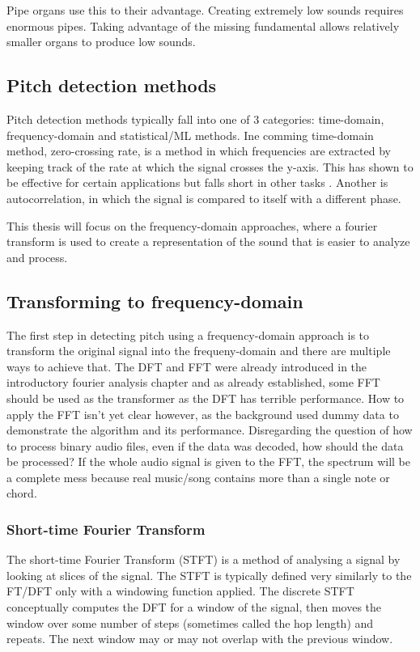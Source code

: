 Pipe organs use this to their advantage. Creating extremely low sounds requires enormous pipes. Taking advantage of the missing fundamental allows relatively smaller organs to produce low sounds.

\subsection{Pitch detection methods}
Pitch detection methods typically fall into one of 3 categories: time-domain, frequency-domain and statistical/ML methods. Ine comming time-domain method, zero-crossing rate, is a method in which frequencies are extracted by keeping track of the rate at which the signal crosses the y-axis. This has shown to be effective for certain applications but falls short in other tasks . Another is autocorrelation, in which the signal is compared to itself with a different phase. 

This thesis will focus on the frequency-domain approaches, where a fourier transform is used to create a representation of the sound that is easier to analyze and process.

\subsection {Transforming to frequency-domain}
The first step in detecting pitch using a frequency-domain approach is to transform the original signal into the frequeny-domain and there are multiple ways to achieve that. The DFT and FFT were already introduced in the introductory fourier analysis chapter and as already established, some FFT should be used as the transformer as the DFT has terrible performance. How to apply the FFT isn't yet clear however, as the background used dummy data to demonstrate the algorithm and its performance. Disregarding the question of how to process binary audio files, even if the data was decoded, how should the data be processed? If the whole audio signal is given to the FFT, the spectrum will be a complete mess because real music/song contains more than a single note or chord.

\subsubsection{Short-time Fourier Transform}
The short-time Fourier Transform (STFT) is a method of analysing a signal by looking at slices of the signal. The STFT is typically defined very similarly to the FT/DFT only with a windowing function applied. The discrete STFT conceptually computes the DFT for a window of the signal, then moves the window over some number of steps (sometimes called the hop length) and repeats. The next window may or may not overlap with the previous window.


